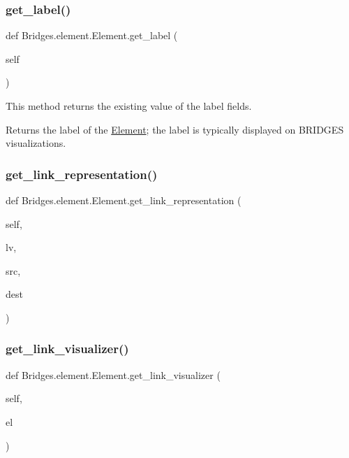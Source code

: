 \subsubsection{\texorpdfstring{get\+\_\+label()}{get\_label()}}
{\footnotesize\ttfamily def Bridges.\+element.\+Element.\+get\+\_\+label (\begin{DoxyParamCaption}\item[{}]{self }\end{DoxyParamCaption})}



This method returns the existing value of the label fields. 

\begin{DoxyReturn}{Returns}
the label of the \mbox{\hyperlink{class_bridges_1_1element_1_1_element}{Element}}; the label is typically displayed on B\+R\+I\+D\+G\+ES visualizations. 
\end{DoxyReturn}
\mbox{\label{class_bridges_1_1element_1_1_element_a3ec5ef88f83374296a873fed8f0f1806}} 
\subsubsection{\texorpdfstring{get\+\_\+link\+\_\+representation()}{get\_link\_representation()}}
{\footnotesize\ttfamily def Bridges.\+element.\+Element.\+get\+\_\+link\+\_\+representation (\begin{DoxyParamCaption}\item[{}]{self,  }\item[{}]{lv,  }\item[{}]{src,  }\item[{}]{dest }\end{DoxyParamCaption})}

\mbox{\label{class_bridges_1_1element_1_1_element_af79b3fc0a157602a476b672e6ecd9dcb}} 
\subsubsection{\texorpdfstring{get\+\_\+link\+\_\+visualizer()}{get\_link\_visualizer()}}
{\footnotesize\ttfamily def Bridges.\+element.\+Element.\+get\+\_\+link\+\_\+visualizer (\begin{DoxyParamCaption}\item[{}]{self,  }\item[{}]{el }\end{DoxyParamCaption})}



